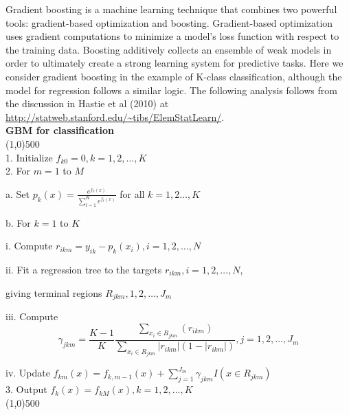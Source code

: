 \documentclass{article}[11pt]
\begin{document}
{Gradient boosting is a machine learning technique that combines two powerful tools: gradient-based optimization and boosting. Gradient-based optimization uses gradient computations to minimize a model's loss function with respect to the training data. Boosting additively collects an ensemble of weak models in order to ultimately create a strong learning system for predictive tasks. Here we consider gradient boosting in the example of K-class classification, although the model for regression follows a similar logic. The following analysis follows from the discussion in Hastie et al (2010) at {\url{http://statweb.stanford.edu/~tibs/ElemStatLearn/}}.
\newline
\\
{\bf{\footnotesize{GBM for classification}}}
\\
\line(1,0){500}
\\ 
1. Initialize $f_{k0} = 0, k = 1,2,\dots,K$ 
\\
2. For $m=1$ to $M$

\hspace{1cm} a. Set $p_k(x) = \frac{e^{f_k(x)}}{\sum_{l=1}^K e^{f_l(x)}}$ for all $k = 1,2\dots, K$

\hspace{1cm} b. For $k=1$ to $K$

\hspace{2cm} i. Compute $r_{ikm} = y_{ik} - p_k(x_i),  i = 1,2,\dots,N$

\hspace{2cm} ii. Fit a regression tree to the targets $r_{ikm}, i = 1,2,\dots,N$, 
\par \hspace{2.5cm} giving terminal regions $R_{jkm}, 1,2,\dots,J_m$

\hspace{2cm}iii. Compute $$\gamma_{jkm} = \frac{K-1}{K} \frac{\sum_{x_i \in R_{jkm}} (r_{ikm})}{\sum_{x_i \in R_{jkm}} |r_{ikm}| (1 - |r_{ikm}|)} , j=1,2,\dots,J_m$$

\hspace{2cm} iv. Update $f_{km}(x) = f_{k,m-1}(x) + \sum_{j=1}^{J_m} \gamma_{jkm} I(x \in R_{jkm})$
\\
3. Output $f_k^{\hat{}}(x) = f_{kM}(x),  k=1,2,\dots,K$
\\
\line(1,0){500}

}
\end{document}
